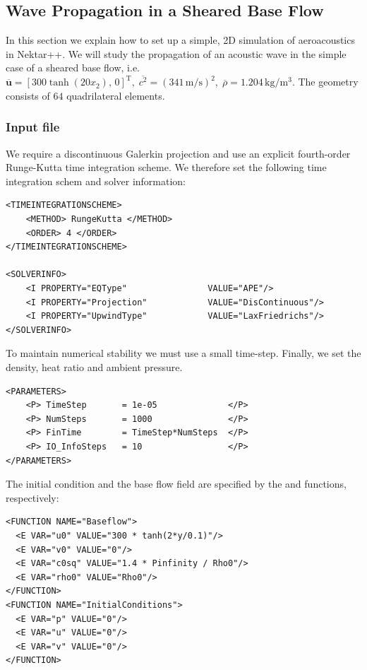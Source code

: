 \subsection{Wave Propagation in a Sheared Base Flow}
In this section we explain how to set up a simple, 2D simulation of aeroacoustics in
Nektar++. We will study the propagation of an acoustic wave in the simple case
of a sheared base flow, i.e. $\overline{\boldsymbol{u}} = \left[300  \tanh(20
x_2),\, 0\right]^{\mathrm{T}}, \; \overline{c^2}=\left(341\, \mathrm{m}/\mathrm{s}\right)^2, \; \overline{\rho} = 1.204\, \mathrm{kg}/\mathrm{m}^3$. The geometry consists
of $64$ quadrilateral elements.

\subsubsection{Input file}
We require a discontinuous Galerkin projection and use an explicit
fourth-order Runge-Kutta time integration scheme. We therefore set the
following time integration schem and solver information:
\begin{lstlisting}[style=XmlStyle]
<TIMEINTEGRATIONSCHEME>
    <METHOD> RungeKutta </METHOD>
    <ORDER> 4 </ORDER>
</TIMEINTEGRATIONSCHEME>

<SOLVERINFO>
    <I PROPERTY="EQType"                VALUE="APE"/>
    <I PROPERTY="Projection"            VALUE="DisContinuous"/>
    <I PROPERTY="UpwindType"            VALUE="LaxFriedrichs"/>
</SOLVERINFO>
\end{lstlisting}

To maintain numerical stability we must use a small time-step.
Finally, we set the density, heat ratio and ambient pressure.
\begin{lstlisting}[style=XMLStyle]
<PARAMETERS>
    <P> TimeStep       = 1e-05              </P>
    <P> NumSteps       = 1000               </P>
    <P> FinTime        = TimeStep*NumSteps  </P>
    <P> IO_InfoSteps   = 10                 </P>
</PARAMETERS>
\end{lstlisting}

The initial condition and the base flow field are specified by the   and   functions, respectively:
\begin{lstlisting}[style=XMLStyle]
<FUNCTION NAME="Baseflow">
  <E VAR="u0" VALUE="300 * tanh(2*y/0.1)"/>
  <E VAR="v0" VALUE="0"/>
  <E VAR="c0sq" VALUE="1.4 * Pinfinity / Rho0"/>
  <E VAR="rho0" VALUE="Rho0"/>
</FUNCTION>
<FUNCTION NAME="InitialConditions">
  <E VAR="p" VALUE="0"/>
  <E VAR="u" VALUE="0"/>
  <E VAR="v" VALUE="0"/>
</FUNCTION>
\end{lstlisting}

